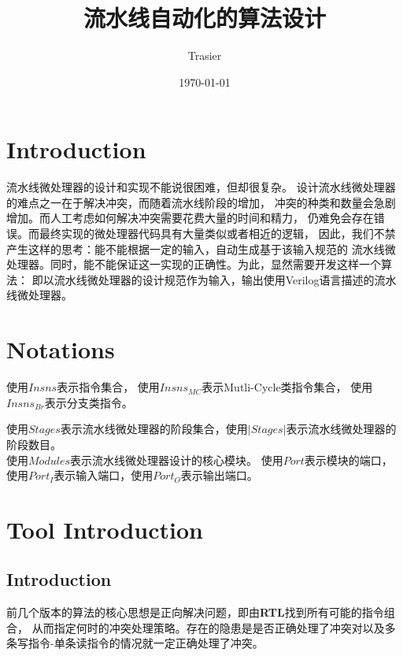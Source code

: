 \documentclass[hyperref,UTF8]{ctexart}
\theoremstyle{definition}
\theoremstyle{remark}
\numberwithin{equation}{subsection}
\newcommand{\Emph}{\textbf}
\begin{document}
\title{\Huge 流水线自动化的算法设计}
\vspace{2cm}
\author{\Large Trasier}
\date{\today}
\maketitle


\section{Introduction}
\label{sec:intro}
	
	流水线微处理器的设计和实现不能说很困难，但却很复杂。
	设计流水线微处理器的难点之一在于解决冲突，而随着流水线阶段的增加，
	冲突的种类和数量会急剧增加。而人工考虑如何解决冲突需要花费大量的时间和精力，
	仍难免会存在错误。而最终实现的微处理器代码具有大量类似或者相近的逻辑，
	因此，我们不禁产生这样的思考：能不能根据一定的输入，自动生成基于该输入规范的
	流水线微处理器。同时，能不能保证这一实现的正确性。为此，显然需要开发这样一个算法：
	即以流水线微处理器的设计规范作为输入，输出使用Verilog语言描述的流水线微处理器。
	

\section{Notations}
\label{sec:notation}
	
	
	
	使用$Insns$表示指令集合，
	使用$Insns_{MC}$表示Mutli-Cycle类指令集合，
	使用$Insns_{Br}$表示分支类指令。
	
	使用$Stages$表示流水线微处理器的阶段集合，使用$|Stages|$表示流水线微处理器的阶段数目。	\\
	
	使用$Modules$表示流水线微处理器设计的核心模块。
	使用$Port$表示模块的端口，使用$Port_I$表示输入端口，使用$Port_O$表示输出端口。
	

\section{Tool Introduction}
\label{sec:ppc_algov5}

\subsection{Introduction}
	
	前几个版本的算法的核心思想是正向解决问题，即由\Emph{RTL}找到所有可能的指令组合，
	从而指定何时的冲突处理策略。存在的隐患是是否正确处理了冲突对以及多条写指令-单条读指令的情况就一定正确处理了冲突。
	
\end{document}
